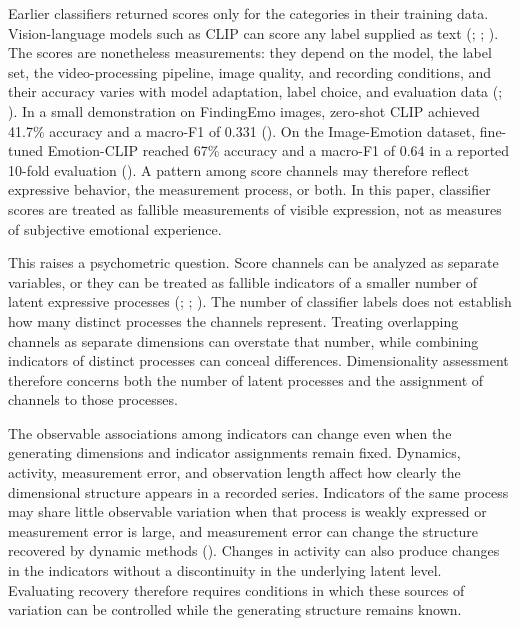 \documentclass[
]{article}
\begin{document}
Earlier classifiers returned scores only for the categories in their
training data. Vision-language models such as CLIP can score any label
supplied as text (; ;
).
The scores are nonetheless measurements: they depend on the model, the
label set, the video-processing pipeline, image quality, and recording
conditions, and their accuracy varies with model adaptation, label
choice, and evaluation data
(;
). In a small demonstration
on FindingEmo images, zero-shot CLIP achieved 41.7\% accuracy and a
macro-F1 of 0.331 (). On the Image-Emotion dataset, fine-tuned Emotion-CLIP
reached 67\% accuracy and a macro-F1 of 0.64 in a reported 10-fold
evaluation (). A pattern among score channels may therefore reflect expressive
behavior, the measurement process, or both. In this paper, classifier
scores are treated as fallible measurements of visible expression, not
as measures of subjective emotional experience.

This raises a psychometric question. Score channels can be analyzed as
separate variables, or they can be treated as fallible indicators of a
smaller number of latent expressive processes
(;
;
). The number of
classifier labels does not establish how many distinct processes the
channels represent. Treating overlapping channels as separate dimensions
can overstate that number, while combining indicators of distinct
processes can conceal differences. Dimensionality assessment therefore
concerns both the number of latent processes and the assignment of
channels to those processes.

The observable associations among indicators can change even when the
generating dimensions and indicator assignments remain fixed. Dynamics,
activity, measurement error, and observation length affect how clearly
the dimensional structure appears in a recorded series. Indicators of
the same process may share little observable variation when that process
is weakly expressed or measurement error is large, and measurement error
can change the structure recovered by dynamic methods
(). Changes in activity can also produce changes in the indicators
without a discontinuity in the underlying latent level. Evaluating
recovery therefore requires conditions in which these sources of
variation can be controlled while the generating structure remains
known.
\end{document}
